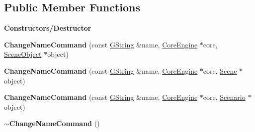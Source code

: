 \subsection*{Public Member Functions}
\begin{Indent}\textbf{ Constructors/\+Destructor}\par
\begin{DoxyCompactItemize}
\item 
\mbox{\label{classrev_1_1_change_name_command_a793f62800bd71eeb458627b6c053f8c2}} 
{\bfseries Change\+Name\+Command} (const \mbox{\hyperlink{classrev_1_1_g_string}{G\+String}} \&name, \mbox{\hyperlink{classrev_1_1_core_engine}{Core\+Engine}} $\ast$core, \mbox{\hyperlink{classrev_1_1_scene_object}{Scene\+Object}} $\ast$object)
\item 
\mbox{\label{classrev_1_1_change_name_command_a68e0b9f3744453a40a8dce76cc26688f}} 
{\bfseries Change\+Name\+Command} (const \mbox{\hyperlink{classrev_1_1_g_string}{G\+String}} \&name, \mbox{\hyperlink{classrev_1_1_core_engine}{Core\+Engine}} $\ast$core, \mbox{\hyperlink{classrev_1_1_scene}{Scene}} $\ast$object)
\item 
\mbox{\label{classrev_1_1_change_name_command_ae49849f18c5323ed62debad07f53647c}} 
{\bfseries Change\+Name\+Command} (const \mbox{\hyperlink{classrev_1_1_g_string}{G\+String}} \&name, \mbox{\hyperlink{classrev_1_1_core_engine}{Core\+Engine}} $\ast$core, \mbox{\hyperlink{classrev_1_1_scenario}{Scenario}} $\ast$object)
\item 
\mbox{\label{classrev_1_1_change_name_command_a2f09edcf68ad1d7118380a9529e583cd}} 
{\bfseries $\sim$\+Change\+Name\+Command} ()
\end{DoxyCompactItemize}
\end{Indent}
